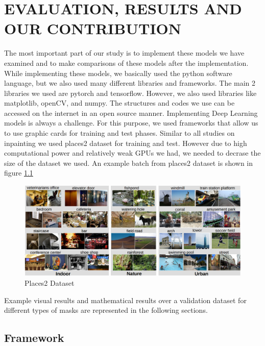 \chapter{EVALUATION, RESULTS AND OUR CONTRIBUTION }\label{our_work}

The most important part of our study is to implement these models we have examined and to make comparisons of these models after the implementation. While implementing these models, we basically used the python software language, but we also used many different libraries and frameworks. The main 2 libraries we used are pytorch and tensorflow. However, we also used libraries like matplotlib, openCV, and numpy. The structures and codes we use can be accessed on the internet in an open source manner.
\newline
Implementing Deep Learning models is always a challenge. For this purpose, we used frameworks that allow us to use graphic cards for training and test phases. Similar to all studies on inpainting we used places2 dataset \cite{dataset_places} for training and test. However due to high computational power and relatively weak GPUs we had, we needed to decrase the size of the dataset we used. An example batch from places2 dataset is shown in figure \ref{fig:dataset}

\begin{figure}[h!]
    \centering
    \includegraphics[scale=0.45]{figures/chapter5/Places2Dataset.PNG}
    \vspace*{4mm}
    \caption{Places2 Dataset \cite{dataset_places}}
    \label{fig:dataset}
\end{figure}

Example visual results and mathematical results over a validation dataset for different types of masks are represented in the following sections.  

\section{Framework}

